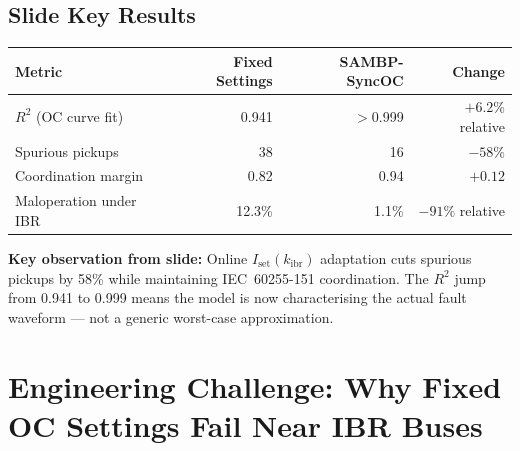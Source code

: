 \documentclass[12pt,a4paper]{article}
\newcommand{\kibr}{k_\mathrm{ibr}}
\newcommand{\Iset}{I_\mathrm{set}}
\begin{document}
\subsection{Slide Key Results}

\begin{center}
\begin{tabular}{@{}lrrr@{}}
\toprule
\textbf{Metric} & \textbf{Fixed Settings} & \textbf{SAMBP-SyncOC} & \textbf{Change} \\
\midrule
$R^2$ (OC curve fit)    & 0.941 & $>$0.999 & $+6.2$\% relative \\
Spurious pickups        & 38    & 16       & $-58\%$ \\
Coordination margin     & 0.82  & 0.94     & $+0.12$ \\
Maloperation under IBR  & 12.3\%& 1.1\%   & $-91\%$ relative \\
\bottomrule
\end{tabular}
\end{center}

\textbf{Key observation from slide:} Online $\Iset(\kibr)$ adaptation cuts spurious pickups by 58\% while maintaining IEC~60255-151 coordination. The $R^2$ jump from 0.941 to 0.999 means the model is now characterising the actual fault waveform --- not a generic worst-case approximation.

\section{Engineering Challenge: Why Fixed OC Settings Fail Near IBR Buses}
\end{document}
